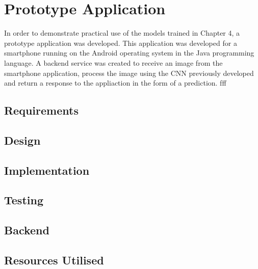 \chapter{Prototype Application}
\label{prototype}
In order to demonstrate practical use of the models trained in Chapter 4, a prototype application was developed.
This application was developed for a smartphone running on the Android operating system in the Java programming language.
A backend service was created to receive an image from the smartphone application, process the image using the CNN previously developed and return a response to the appliaction in the form of a prediction. ƒff

\section{Requirements}


\section{Design}


\section{Implementation}


\section{Testing}


\section{Backend}


\section{Resources Utilised}

